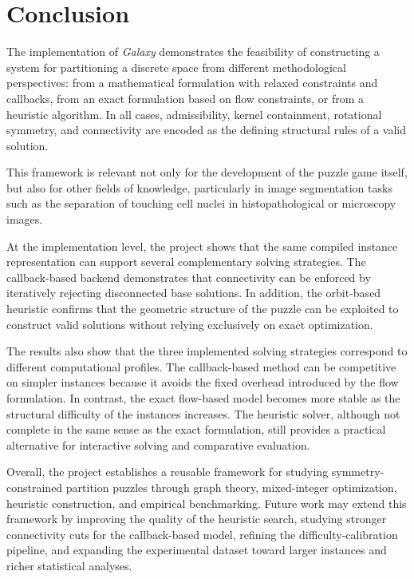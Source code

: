 \section{Conclusion}

The implementation of \textit{Galaxy} demonstrates the feasibility of constructing a system for partitioning a discrete space from different methodological perspectives: from a mathematical formulation with relaxed constraints and callbacks, from an exact formulation based on flow constraints, or from a heuristic algorithm. In all cases, admissibility, kernel containment, rotational symmetry, and connectivity are encoded as the defining structural rules of a valid solution.

This framework is relevant not only for the development of the puzzle game itself, but also for other fields of knowledge, particularly in image segmentation tasks such as the separation of touching cell nuclei in histopathological or microscopy images.

At the implementation level, the project shows that the same compiled instance representation can support several complementary solving strategies. The callback-based backend demonstrates that connectivity can be enforced by iteratively rejecting disconnected base solutions. In addition, the orbit-based heuristic confirms that the geometric structure of the puzzle can be exploited to construct valid solutions without relying exclusively on exact optimization.

The results also show that the three implemented solving strategies correspond to different computational profiles. The callback-based method can be competitive on simpler instances because it avoids the fixed overhead introduced by the flow formulation. In contrast, the exact flow-based model becomes more stable as the structural difficulty of the instances increases. The heuristic solver, although not complete in the same sense as the exact formulation, still provides a practical alternative for interactive solving and comparative evaluation.

Overall, the project establishes a reusable framework for studying symmetry-constrained partition puzzles through graph theory, mixed-integer optimization, heuristic construction, and empirical benchmarking. Future work may extend this framework by improving the quality of the heuristic search, studying stronger connectivity cuts for the callback-based model, refining the difficulty-calibration pipeline, and expanding the experimental dataset toward larger instances and richer statistical analyses.